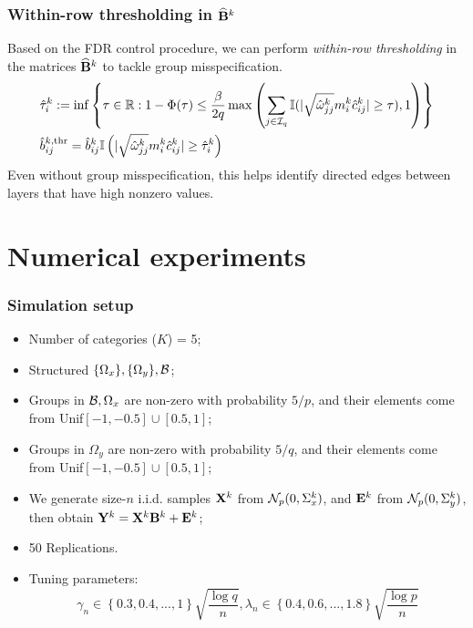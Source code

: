 \documentclass[10pt]{beamer}
\theoremstyle{definition}
\begin{document}
\begin{frame}
\frametitle{Within-row thresholding in $\widehat {{\mathbf{B}}}^k$}

Based on the FDR control procedure, we can perform {\it within-row thresholding} in the matrices $\widehat {{\mathbf{B}}}^k$ to tackle group misspecification.
%
\begin{align*}
& \hat \tau_i^k := \inf \left\{\tau \in {\mathbb{R}}: 1 - \Phi(\tau) \leq \frac{\beta}{2 q}
\max \left( \sum_{j \in {\cal{I}}_q} {\mathbb{I}}( | \sqrt{\hat \omega_{jj}^k} m_i^k \hat c_{ij}^k | \geq \tau), 1 \right) \right\} \notag\\
& \hat b_{ij}^{k, \text{thr}} =  \hat b_{ij}^k {\mathbb{I}} \left(
|\sqrt{\hat \omega_{jj}^k} m_i^k \hat c_{ij}^k | \geq \hat \tau_i^k \right)
\end{align*}
%
Even without group misspecification, this helps identify directed edges between layers that have high nonzero values.
\end{frame}

\section{Numerical experiments}

\begin{frame}
\frametitle{Simulation setup}
\begin{itemize}
\item Number of categories ($K$) = 5;

\item Structured $\{ \Omega_x\}, \{\Omega_y\}, {\cal{B}}$;

\item Groups in ${\cal{B}},\Omega_x$ are non-zero with probability $5/p$, and their elements come from Unif$[-1, -0.5] \cup [0.5,1]$;

\item Groups in $\Omega_y$ are non-zero with probability $5/q$, and their elements come from Unif$[-1, -0.5] \cup [0.5,1]$;

\item We generate size-$n$ i.i.d. samples ${\mathbf{X}}^k$ from ${\cal{N}}_p(0, \Sigma_x^k)$, and ${\mathbf{E}}^k$ from ${\cal{N}}_p(0, \Sigma_y^k)$, then obtain ${\mathbf{Y}}^k = {\mathbf{X}}^k {\mathbf{B}}^k + {\mathbf{E}}^k$;

\item 50 Replications.

\item Tuning parameters:
$$
\gamma_n \in \left\{ 0.3, 0.4, ..., 1 \right\} \sqrt{\frac{\log q}{n}}, 
\lambda_n \in \left\{ 0.4, 0.6, ..., 1.8 \right\} \sqrt{\frac{\log p}{n}}
$$

\end{itemize}
\end{frame}
\end{document}
